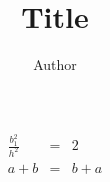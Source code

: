 \documentclass[]{article}
\begin{document}
\title{Title}

\author{Author}


\begin{eqnarray}%
\frac{b_1^2}{h^2} & = & 2 \\
a+b & = & b+a
\end{eqnarray}%
\end{document}
